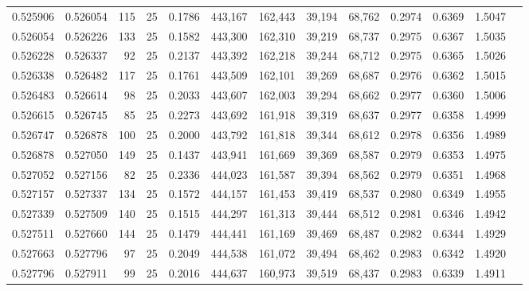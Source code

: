 \begin{tabular}{rrrrrrrrrrrrr}
0.525906 & 0.526054 &   115 &  25 &                                     0.1786 & 443,167 & 162,443 &  39,194 &  68,762 & 0.2974 & 0.6369 & 1.5047 \\
0.526054 & 0.526226 &   133 &  25 &                                     0.1582 & 443,300 & 162,310 &  39,219 &  68,737 & 0.2975 & 0.6367 & 1.5035 \\
0.526228 & 0.526337 &    92 &  25 &                                     0.2137 & 443,392 & 162,218 &  39,244 &  68,712 & 0.2975 & 0.6365 & 1.5026 \\
0.526338 & 0.526482 &   117 &  25 &                                     0.1761 & 443,509 & 162,101 &  39,269 &  68,687 & 0.2976 & 0.6362 & 1.5015 \\
0.526483 & 0.526614 &    98 &  25 &                                     0.2033 & 443,607 & 162,003 &  39,294 &  68,662 & 0.2977 & 0.6360 & 1.5006 \\
0.526615 & 0.526745 &    85 &  25 &                                     0.2273 & 443,692 & 161,918 &  39,319 &  68,637 & 0.2977 & 0.6358 & 1.4999 \\
0.526747 & 0.526878 &   100 &  25 &                                     0.2000 & 443,792 & 161,818 &  39,344 &  68,612 & 0.2978 & 0.6356 & 1.4989 \\
0.526878 & 0.527050 &   149 &  25 &                                     0.1437 & 443,941 & 161,669 &  39,369 &  68,587 & 0.2979 & 0.6353 & 1.4975 \\
0.527052 & 0.527156 &    82 &  25 &                                     0.2336 & 444,023 & 161,587 &  39,394 &  68,562 & 0.2979 & 0.6351 & 1.4968 \\
0.527157 & 0.527337 &   134 &  25 &                                     0.1572 & 444,157 & 161,453 &  39,419 &  68,537 & 0.2980 & 0.6349 & 1.4955 \\
0.527339 & 0.527509 &   140 &  25 &                                     0.1515 & 444,297 & 161,313 &  39,444 &  68,512 & 0.2981 & 0.6346 & 1.4942 \\
0.527511 & 0.527660 &   144 &  25 &                                     0.1479 & 444,441 & 161,169 &  39,469 &  68,487 & 0.2982 & 0.6344 & 1.4929 \\
0.527663 & 0.527796 &    97 &  25 &                                     0.2049 & 444,538 & 161,072 &  39,494 &  68,462 & 0.2983 & 0.6342 & 1.4920 \\
0.527796 & 0.527911 &    99 &  25 &                                     0.2016 & 444,637 & 160,973 &  39,519 &  68,437 & 0.2983 & 0.6339 & 1.4911 \\

\end{tabular}
